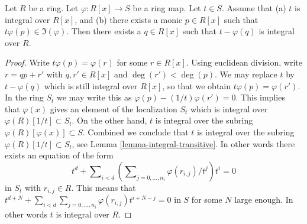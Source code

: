 \begin{lemma}
\label{lemma-make-integral-trick}
Let $R$ be a ring. Let $\varphi : R[x] \to S$ be
a ring map. Let $t \in S$.
Assume that (a) $t$ is integral over $R[x]$,
and (b) there exists a monic $p \in R[x]$ such that
$t \varphi(p) \in \Im(\varphi)$. Then there
exists a $q \in R[x]$ such that $t - \varphi(q)$
is integral over $R$.
\end{lemma}

\begin{proof}
Write $t \varphi(p) = \varphi(r)$ for some $r \in R[x]$.
Using euclidean division, write $r = qp + r'$ with
$q, r' \in R[x]$ and $\deg(r') < \deg(p)$. We may replace
$t$ by $t - \varphi(q)$ which is still integral over
$R[x]$, so that we obtain $t \varphi(p) = \varphi(r')$.
In the ring $S_t$ we may write this as
$\varphi(p) - (1/t) \varphi(r') = 0$.
This implies that $\varphi(x)$ gives an element of the
localization $S_t$ which is integral over
$\varphi(R)[1/t] \subset S_t$. On the other hand,
$t$ is integral over the subring $\varphi(R)[\varphi(x)] \subset S$.
Combined we conclude that $t$ is integral over
the subring $\varphi(R)[1/t] \subset S_t$, see Lemma
\ref{lemma-integral-transitive}. In other words
there exists an equation of the form
$$
t^d + \sum\nolimits_{i < d}
\left(\sum\nolimits_{j = 0, \ldots, n_i} \varphi(r_{i, j})/t^j\right) t^i = 0
$$
in $S_t$ with $r_{i, j} \in R$. This means that
$t^{d + N} +
\sum_{i < d} \sum_{j = 0, \ldots, n_i} \varphi(r_{i, j}) t^{i + N - j} = 0$
in $S$ for some $N$ large enough. In other words
$t$ is integral over $R$.
\end{proof}
